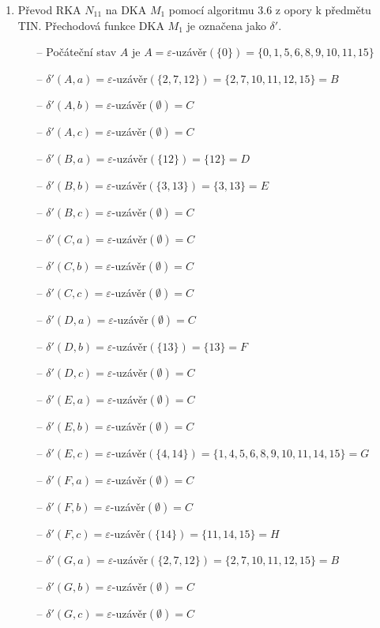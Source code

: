 \documentclass[a4paper,12pt]{article}
\begin{document}
\begin{enumerate}[label=\textbf{\arabic*}.]
\begin{enumerate}
  \item Převod RKA $N_{11}$ na DKA $M_1$ pomocí algoritmu 3.6 z opory k předmětu TIN. Přechodová funkce 
    DKA $M_1$ je označena jako $\delta'$.
  \begin{itemize}
   \item[--] Počáteční stav $A$ je $A = \varepsilon$-uzávěr$(\{0\}) = \{0,1,5,6,8,9,10,11,15\}$
   \item[--] $\delta'(A,a) = \varepsilon$-uzávěr$(\{2,7,12\}) = \{2,7,10,11,12,15\} = B$
   \item[--] $\delta'(A,b) = \varepsilon$-uzávěr$(\emptyset) = C$
   \item[--] $\delta'(A,c) = \varepsilon$-uzávěr$(\emptyset) = C$
   \item[--] $\delta'(B,a) = \varepsilon$-uzávěr$(\{12\}) = \{12\} = D$
   \item[--] $\delta'(B,b) = \varepsilon$-uzávěr$(\{3,13\}) = \{3,13\} = E$
   \item[--] $\delta'(B,c) = \varepsilon$-uzávěr$(\emptyset) = C$
   \item[--] $\delta'(C,a) = \varepsilon$-uzávěr$(\emptyset) = C$
   \item[--] $\delta'(C,b) = \varepsilon$-uzávěr$(\emptyset) = C$
   \item[--] $\delta'(C,c) = \varepsilon$-uzávěr$(\emptyset) = C$
   \item[--] $\delta'(D,a) = \varepsilon$-uzávěr$(\emptyset) = C$
   \item[--] $\delta'(D,b) = \varepsilon$-uzávěr$(\{13\}) = \{13\} = F$
   \item[--] $\delta'(D,c) = \varepsilon$-uzávěr$(\emptyset) = C$
   
   \item[--] $\delta'(E,a) = \varepsilon$-uzávěr$(\emptyset) = C$
   \item[--] $\delta'(E,b) = \varepsilon$-uzávěr$(\emptyset) = C$
   \item[--] $\delta'(E,c) = \varepsilon$-uzávěr$(\{4,14\}) = \{1,4,5,6,8,9,10,11,14,15\} = G$
   
   \item[--] $\delta'(F,a) = \varepsilon$-uzávěr$(\emptyset) = C$
   \item[--] $\delta'(F,b) = \varepsilon$-uzávěr$(\emptyset) = C$
   \item[--] $\delta'(F,c) = \varepsilon$-uzávěr$(\{14\}) = \{11,14,15\} = H$
   
   \item[--] $\delta'(G,a) = \varepsilon$-uzávěr$(\{2,7,12\}) = \{2,7,10,11,12,15\} = B$
   \item[--] $\delta'(G,b) = \varepsilon$-uzávěr$(\emptyset) = C$
   \item[--] $\delta'(G,c) = \varepsilon$-uzávěr$(\emptyset) = C$
   

\end{itemize}
\end{enumerate}
\end{enumerate}
\end{document}
